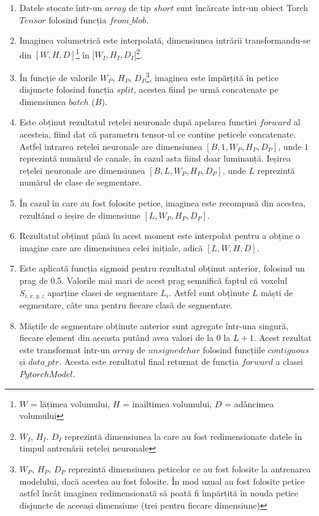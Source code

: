 \begin{enumerate}
    \item Datele stocate într-un $array$ de tip $short$ sunt încărcate într-un obiect Torch $Tensor$ folosind funcția $from\_blob$.
    \item Imaginea volumetrică este interpolată, dimensiunea intrării transformandu-se din $[W, H, D]$\footnote{$W$ = lățimea volumului, $H$ = inailtimea volumului, $D$ = adâncimea volumului} în $[W_I, H_I, D_I$]\footnote{$W_I$, $H_I$. $D_I$ reprezintă dimensiunea la care au fost redimensionate datele în timpul antrenării rețelei neuronale}.
    \item În funcție de valorile $W_P$, $H_P$, $D_P$\footnote{$W_P$, $H_P$, $D_P$ reprezintă dimensiunea peticelor ce au fost folosite la antrenarea modelului, dacă acestea au fost folosite. În mod uzual au fost folosite petice astfel încât imaginea redimensionată să poată fi împărțită în nouda petice disjuncte de aceeași dimensiune (trei pentru fiecare dimensiune)}, imaginea este împărțită în petice disjuncte folosind funcția $split$, acestea fiind pe urmă concatenate pe dimensiunea $batch$ ($B$).
    \item Este obținut rezultatul rețelei neuronale după apelarea funcției $forward$ al acesteia, fiind dat că parametru tensor-ul ce conține peticele concatenate. Astfel intrarea rețelei neuronale are dimensiunea $[B, 1, W_P, H_P, D_P]$, unde $1$ reprezintă numărul de canale, în cazul asta fiind doar luminanță. Ieșirea rețelei neuronale are dimensiunea $[B, L, W_P, H_P, D_P]$, unde $L$ reprezintă numărul de clase de segmentare.
    \item În cazul în care au fost folosite petice, imaginea este recompusă din acestea, rezultând o ieșire de dimensiune $[L, W_P, H_P, D_P]$.
    \item Rezultatul obținut până în acest moment este interpolat pentru a obține o imagine care are dimensiunea celei inițiale, adică $[L, W, H, D]$.
    \item Este aplicată funcția sigmoid pentru rezultatul obținut anterior, folosind un prag de 0.5. Valorile mai mari de acest prag semnifică faptul că voxelul $S_{i, x, y, z}$ aparține clasei de segmentare $L_i$. Astfel sunt obținute $L$ măști de segmentare, câte una pentru fiecare clasă de segmentare.
    \item Măștile de segmentare obținute anterior sunt agregate într-una singură, fiecare element din aceasta putând avea valori de la 0 la $L+1$. Acest rezultat este transformat într-un $array$ de $unsigned char$ folosind funcțiile $contiguous$ și $data\_ptr$. Acesta este rezultatul final returnat de funcția $forward$ a clasei $PytorchModel$.
\end{enumerate}

